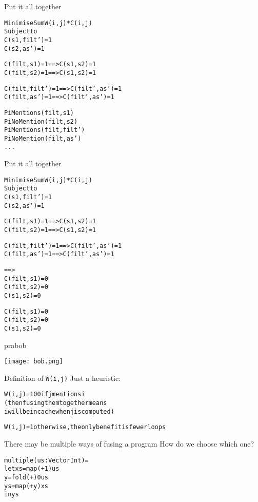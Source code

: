 \documentclass{beamer}
\newcommand{\bl}[1]{\textcolor[rgb]{0.0,0.5,0.9}{#1}}
\newcommand{\g}[1]{\textcolor[rgb]{0.7,0.3,0.3}{#1}}
\newcommand{\fr}[1]{\begin{frame}[fragile]{#1}}
\begin{document}
\fr{Put it all together}

\begin{alltt}
Minimise   Sum \bl{W(i,j)} * \bl{C(i,j)}
Subject to 
     \bl{C(s1,filt')}   = 1
     \bl{C(s2,as')}     = 1

     \bl{C(filt,s1)}    = 1 ==> \bl{C(s1,s2)}     = 1
     \bl{C(filt,s2)}    = 1 ==> \bl{C(s1,s2)}     = 1

     \bl{C(filt,filt')} = 1 ==> \bl{C(filt',as')} = 1
     \bl{C(filt,as')}   = 1 ==> \bl{C(filt',as')} = 1

     PiMentions  (filt, s1)
     PiNoMention (filt, s2)
     PiMentions  (filt, filt')
     PiNoMention (filt, as')
     ...
\end{alltt}
\end{frame}

\fr{Put it all together}

\begin{alltt}
Minimise   Sum \bl{W(i,j)} * \bl{C(i,j)}
Subject to 
     \bl{C(s1,filt')}   = 1
     \bl{C(s2,as')}     = 1

     \bl{C(filt,s1)}    = 1 ==> \bl{C(s1,s2)}     = 1
     \bl{C(filt,s2)}    = 1 ==> \bl{C(s1,s2)}     = 1

     \bl{C(filt,filt')} = 1 ==> \bl{C(filt',as')} = 1
     \bl{C(filt,as')}   = 1 ==> \bl{C(filt',as')} = 1

==>
\bl{C(filt, s1)}    = 0
\bl{C(filt, s2)}    = 0
\bl{C(s1,   s2)}    = 0

\bl{C(filt, s1)}    = 0
\bl{C(filt, s2)}    = 0
\bl{C(s1,   s2)}    = 0

\end{alltt}
\end{frame}


\fr{prabob}
\begin{center}
\texttt{[image: bob.png]}
\end{center}
\end{frame}

\fr{Definition of \bl{\tt W(i,j)}}
Just a heuristic:
\begin{alltt}
W(i,j) = 100 if j mentions i
             (then fusing them together means
             i will be in cache when j is computed)

W(i,j) = 1   otherwise, the only benefit is fewer loops
\end{alltt}
\end{frame}

\fr{There may be multiple ways of fusing a program}
How do we choose which one?
\begin{alltt}
multiple (\bl{us} : Vector Int) =
 let \bl{xs} = \g{map}  (+1)  \bl{us}
     \bl{y}  = \g{fold} (+) 0 \bl{us}
     \bl{ys} = \g{map}  (+y)  \bl{xs}
 in  \bl{ys}
\end{alltt}
\end{frame}
\end{document}
